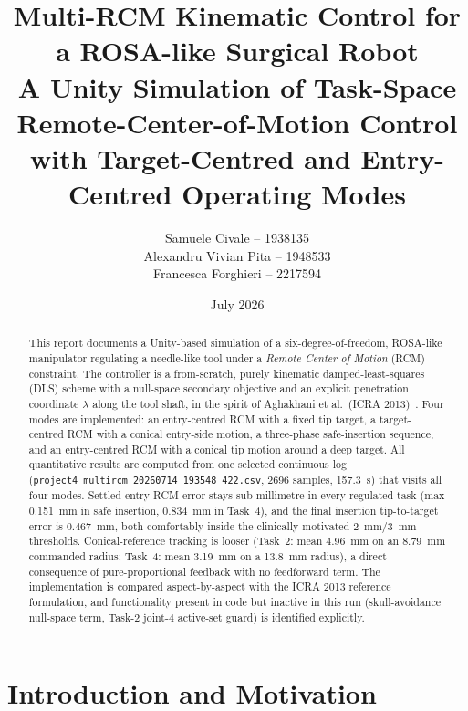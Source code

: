 \documentclass[11pt,a4paper]{article}
\title{\textbf{Multi-RCM Kinematic Control for a ROSA-like Surgical Robot}\\[2pt]
\large A Unity Simulation of Task-Space Remote-Center-of-Motion Control\\
with Target-Centred and Entry-Centred Operating Modes}
\author{
Samuele Civale -- 1938135 \\
Alexandru Vivian Pita -- 1948533 \\
Francesca Forghieri -- 2217594
}
\date{July 2026}
\begin{document}
\maketitle
\vspace{-8pt}

\begin{abstract}
\noindent This report documents a Unity-based simulation of a six-degree-of-freedom, ROSA-like manipulator regulating a needle-like tool under a \emph{Remote Center of Motion} (RCM) constraint. The controller is a from-scratch, purely kinematic damped-least-squares (DLS) scheme with a null-space secondary objective and an explicit penetration coordinate $\lambda$ along the tool shaft, in the spirit of Aghakhani et al.\ (ICRA 2013)~\cite{aghakhani2013}. Four modes are implemented: an entry-centred RCM with a fixed tip target, a target-centred RCM with a conical entry-side motion, a three-phase safe-insertion sequence, and an entry-centred RCM with a conical tip motion around a deep target. All quantitative results are computed from one selected continuous log (\texttt{project4\_multircm\_20260714\_193548\_422.csv}, 2696 samples, \SI{157.3}{\second}) that visits all four modes. Settled entry-RCM error stays sub-millimetre in every regulated task (max \SI{0.151}{\milli\meter} in safe insertion, \SI{0.834}{\milli\meter} in Task~4), and the final insertion tip-to-target error is \SI{0.467}{\milli\meter}, both comfortably inside the clinically motivated \SI{2}{\milli\meter}/\SI{3}{\milli\meter} thresholds. Conical-reference tracking is looser (Task~2: mean \SI{4.96}{\milli\meter} on an \SI{8.79}{\milli\meter} commanded radius; Task~4: mean \SI{3.19}{\milli\meter} on a \SI{13.8}{\milli\meter} radius), a direct consequence of pure-proportional feedback with no feedforward term. The implementation is compared aspect-by-aspect with the ICRA 2013 reference formulation, and functionality present in code but inactive in this run (skull-avoidance null-space term, Task-2 joint-4 active-set guard) is identified explicitly.
\end{abstract}

\section{Introduction and Motivation}
\label{sec:intro}
\end{document}
